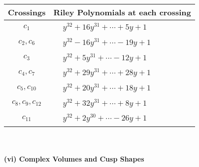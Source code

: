 \documentclass[1p]{elsarticle_modified}
\theoremstyle{definition}
\begin{document}
\begin{tabular}{m{50pt}|m{274pt}}
Crossings & \hspace{64pt}Riley Polynomials at each crossing \\
\hline $$\begin{aligned}c_{1}\end{aligned}$$&$\begin{aligned}
&y^{32}+16 y^{31}+\cdots+5 y+1
\end{aligned}$\\
\hline $$\begin{aligned}c_{2},c_{6}\end{aligned}$$&$\begin{aligned}
&y^{32}-16 y^{31}+\cdots-19 y+1
\end{aligned}$\\
\hline $$\begin{aligned}c_{3}\end{aligned}$$&$\begin{aligned}
&y^{32}+5 y^{31}+\cdots-12 y+1
\end{aligned}$\\
\hline $$\begin{aligned}c_{4},c_{7}\end{aligned}$$&$\begin{aligned}
&y^{32}+29 y^{31}+\cdots+28 y+1
\end{aligned}$\\
\hline $$\begin{aligned}c_{5},c_{10}\end{aligned}$$&$\begin{aligned}
&y^{32}+20 y^{31}+\cdots+18 y+1
\end{aligned}$\\
\hline $$\begin{aligned}c_{8},c_{9},c_{12}\end{aligned}$$&$\begin{aligned}
&y^{32}+32 y^{31}+\cdots+8 y+1
\end{aligned}$\\
\hline $$\begin{aligned}c_{11}\end{aligned}$$&$\begin{aligned}
&y^{32}+2 y^{30}+\cdots-26 y+1
\end{aligned}$\\
\hline
\end{tabular}\\~\\
\newpage\flushleft \textbf{(vi) Complex Volumes and Cusp Shapes}
\end{document}
